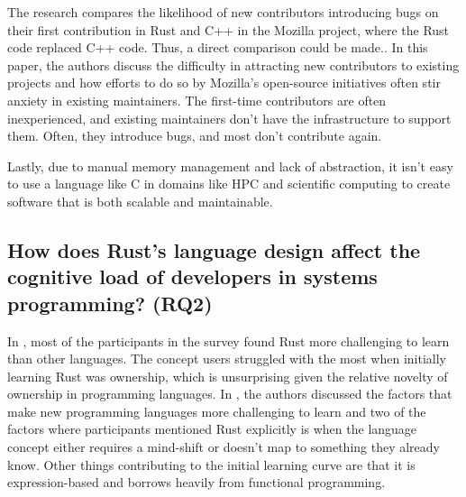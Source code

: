\documentclass[conference]{IEEEtran}
\begin{document}
The research compares the likelihood of new contributors introducing bugs on their first contribution in Rust and C++ in the Mozilla project, where the Rust code replaced C++ code. Thus, a direct comparison could be made.\cite{traceyGradingCurveHow2023}. In this paper, the authors discuss the difficulty in attracting new contributors to existing projects and how efforts to do so by Mozilla's open-source initiatives often stir anxiety in existing maintainers. The first-time contributors are often inexperienced, and existing maintainers don't have the infrastructure to support them. Often, they introduce bugs, and most don't contribute again.

Lastly, due to manual memory management and lack of abstraction, it isn't easy to use a language like C in domains like HPC and scientific computing to create software that is both scalable and maintainable\cite{costanzoPerformanceVsProgramming2021}.


\subsection{How does Rust's language design affect the cognitive load of developers in systems programming? (RQ2)}

In \cite{fultonBenefitsDrawbacksAdopting2021}, most of the
participants in the survey found Rust more challenging to learn than other languages. The concept users struggled with the most when initially learning Rust was ownership, which is unsurprising given the relative novelty of ownership in programming languages. In \cite{shresthaHereWeGo2020}, the authors discussed the factors that make new programming languages more challenging to learn and two of the factors where participants mentioned Rust explicitly is when the language concept either requires a mind-shift or doesn't map to something they already know. Other things contributing to the initial learning curve are that it is expression-based and borrows heavily from functional programming.

\end{document}
